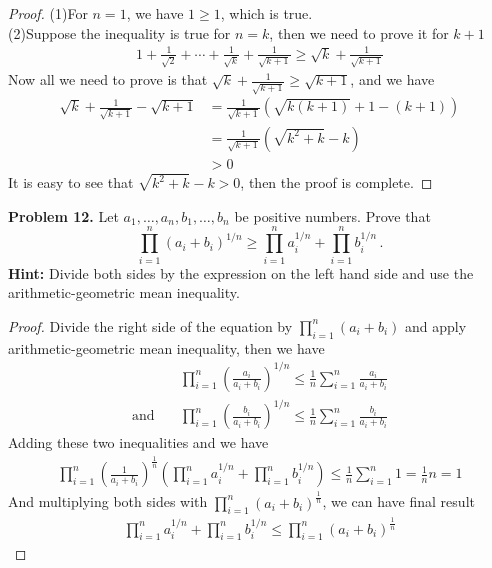 \documentclass[12pt,leqno]{amsart}
\begin{document}
\begin{proof}
(1)For $n = 1$, we have $1 \geq 1$, which is true.\\
\hspace*{2em}(2)Suppose the inequality is true for $n = k$, then we need to prove it for $k + 1$
\begin{align*}
    1 + \frac{1}{\sqrt{2}} + \cdots + \frac{1}{\sqrt{k}} + \frac{1}{\sqrt{k + 1}} \geq \sqrt{k} + \frac{1}{\sqrt{k + 1}} 
\end{align*}
Now all we need to prove is that $\sqrt{k} + \frac{1}{\sqrt{k + 1}} \geq \sqrt{k + 1}$, and we have
\begin{align*}
    \sqrt{k} + \frac{1}{\sqrt{k + 1}} - \sqrt{k + 1} & = \frac{1}{\sqrt{k + 1}} \left(\sqrt{k(k + 1)} + 1 - (k + 1)\right) \\
    & = \frac{1}{\sqrt{k + 1}} \left(\sqrt{k^2 + k} - k\right) \\
    & > 0
\end{align*}
It is easy to see that $\sqrt{k^2 + k} - k > 0$, then the proof is complete.
\end{proof}



\medskip

\noindent
{\bf Problem 12.}
{ Let $a_1,\ldots, a_n, b_1,\ldots, b_n$ be positive numbers.
Prove that
$$
\prod_{i=1}^n (a_i+b_i)^{1/n} \geq
\prod_{i=1}^n a_i^{1/n} +
\prod_{i=1}^n b_i^{1/n}\, .
$$
{\bf Hint:} Divide both sides by the expression on the left hand side and use the arithmetic-geometric mean inequality.}

\begin{proof}
Divide the right side of the equation by $\prod_{i=1}^n (a_i+b_i)$ and apply arithmetic-geometric mean inequality, then we have 
\begin{align*}
    & \prod_{i=1}^n \left(\frac{a_i}{a_i + b_i}\right)^{1/n} \leq \frac{1}{n} \sum^n_{i=1} \frac{a_i}{a_i + b_i} \\
    \text{and} \quad & \prod_{i=1}^n \left(\frac{b_i}{a_i + b_i}\right)^{1/n} \leq \frac{1}{n} \sum^n_{i=1} \frac{b_i}{a_i + b_i}
\end{align*}
Adding these two inequalities and we have 
\begin{align*}
    \prod_{i=1}^n \left(\frac{1}{a_i + b_i} \right)^\frac{1}{n} \left(\prod_{i=1}^n a_i^{1/n} + \prod_{i=1}^n b_i^{1/n} \right) \leq \frac{1}{n} \sum^n_{i=1} 1 = \frac{1}{n} n = 1
\end{align*}
And multiplying both sides with $\prod_{i=1}^n \left(a_i + b_i\right)^\frac{1}{n}$, we can have final result
\begin{align*}
    \prod_{i=1}^n a_i^{1/n} + \prod_{i=1}^n b_i^{1/n} \leq \prod_{i=1}^n \left(a_i + b_i\right)^\frac{1}{n}
\end{align*}
\end{proof}
\end{document}
